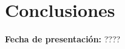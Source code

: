 \documentclass[../portafolio.tex]{subfiles}
\begin{document}
\chapter{Conclusiones}

\hfill \textbf{Fecha de presentación:} ????

\medskip






\end{document}

